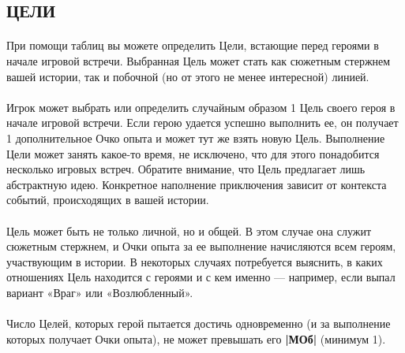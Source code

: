 \subsection{ЦЕЛИ}
\paragraph{}
При помощи таблиц вы можете определить Цели, встающие перед героями в начале игровой встречи. Выбранная Цель может стать как сюжетным стержнем вашей истории, так и побочной (но от этого не менее интересной) линией.
\paragraph{}
Игрок может выбрать или определить случайным образом 1 Цель своего героя в начале игровой встречи. Если герою удается успешно выполнить ее, он получает 1 дополнительное Очко опыта и может тут же взять новую Цель. Выполнение Цели может занять какое-то время, не исключено, что для этого понадобится несколько игровых встреч. Обратите внимание, что Цель предлагает лишь абстрактную идею. Конкретное наполнение приключения зависит от контекста событий, происходящих в вашей истории.
\paragraph{}
Цель может быть не только личной, но и общей. В этом случае она служит сюжетным стержнем, и Очки опыта за ее выполнение начисляются всем героям, участвующим в истории. В некоторых случаях потребуется выяснить, в каких отношениях Цель находится с героями и с кем именно — например, если выпал вариант «Враг» или «Возлюбленный».
\paragraph{}
Число Целей, которых герой пытается достичь одновременно (и за выполнение которых получает Очки опыта), не может превышать его \textbf{|МОб|} (минимум 1).
